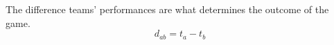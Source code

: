 \documentclass[a4paper,11pt]{book}
\theoremstyle{definition}
\begin{document}
\noindent{}The difference teams' performances are what determines the outcome of the game.
\begin{equation}
d_{ab}=t_a - t_b
\end{equation}
%
%
%
%
\end{document}

